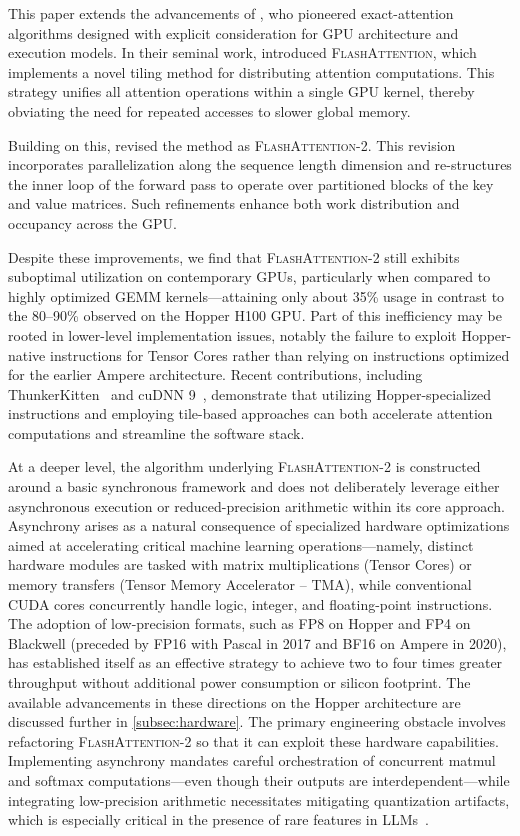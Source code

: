 This paper extends the advancements of \citet{dao2022flashattention}, who pioneered exact-attention algorithms designed with explicit consideration for GPU architecture and execution models. In their seminal work, \citet{dao2022flashattention} introduced \textsc{FlashAttention}, which implements a novel tiling method for distributing attention computations. This strategy unifies all attention operations within a single GPU kernel, thereby obviating the need for repeated accesses to slower global memory.

Building on this, \citet{dao2023flashattention2} revised the method as \textsc{FlashAttention-2}. This revision incorporates parallelization along the sequence length dimension and re-structures the inner loop of the forward pass to operate over partitioned blocks of the key and value matrices. Such refinements enhance both work distribution and occupancy across the GPU.

Despite these improvements, we find that \textsc{FlashAttention-2} still exhibits suboptimal utilization on contemporary GPUs, particularly when compared to highly optimized GEMM kernels—attaining only about 35\% usage in contrast to the 80–90\% observed on the Hopper H100 GPU. Part of this inefficiency may be rooted in lower-level implementation issues, notably the failure to exploit Hopper-native instructions for Tensor Cores rather than relying on instructions optimized for the earlier Ampere architecture. Recent contributions, including ThunkerKitten~\citep{spector2024thunder} and cuDNN 9~\citep{cudnn9}, demonstrate that utilizing Hopper-specialized instructions and employing tile-based approaches can both accelerate attention computations and streamline the software stack.

At a deeper level, the algorithm underlying \textsc{FlashAttention-2} is constructed around a basic synchronous framework and does not deliberately leverage either asynchronous execution or reduced-precision arithmetic within its core approach. Asynchrony arises as a natural consequence of specialized hardware optimizations aimed at accelerating critical machine learning operations—namely, distinct hardware modules are tasked with matrix multiplications (Tensor Cores) or memory transfers (Tensor Memory Accelerator -- TMA), while conventional CUDA cores concurrently handle logic, integer, and floating-point instructions. The adoption of low-precision formats, such as FP8 on Hopper and FP4 on Blackwell (preceded by FP16 with Pascal in 2017 and BF16 on Ampere in 2020), has established itself as an effective strategy to achieve two to four times greater throughput without additional power consumption or silicon footprint. The available advancements in these directions on the Hopper architecture are discussed further in \cref{subsec:hardware}. 
The primary engineering obstacle involves refactoring \textsc{FlashAttention-2} so that it can exploit these hardware capabilities. Implementing asynchrony mandates careful orchestration of concurrent matmul and softmax computations—even though their outputs are interdependent—while integrating low-precision arithmetic necessitates mitigating quantization artifacts, which is especially critical in the presence of rare features in LLMs~\citep{dettmers2208llm, sun2024massive}.

